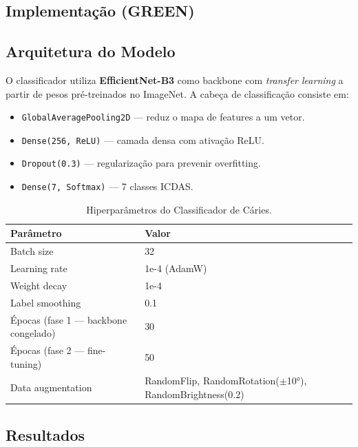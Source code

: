 \subsection{Implementação (GREEN)}


\subsection{Arquitetura do Modelo}

O classificador utiliza \textbf{EfficientNet-B3} como backbone com
\textit{transfer learning} a partir de pesos pré-treinados no ImageNet.
A cabeça de classificação consiste em:

\begin{itemize}
  \item \texttt{GlobalAveragePooling2D} — reduz o mapa de features a um vetor.
  \item \texttt{Dense(256, ReLU)} — camada densa com ativação ReLU.
  \item \texttt{Dropout(0.3)} — regularização para prevenir overfitting.
  \item \texttt{Dense(7, Softmax)} — 7 classes ICDAS.
\end{itemize}

\begin{table}[H]
  \centering
  \caption{Hiperparâmetros do Classificador de Cáries.}
  \label{tab:caries-hyperparams}
  \begin{tabularx}{\textwidth}{lX}
    \toprule
    \textbf{Parâmetro} & \textbf{Valor} \\
    \midrule
    Batch size & 32 \\
    Learning rate & 1e-4 (AdamW) \\
    Weight decay & 1e-4 \\
    Label smoothing & 0.1 \\
    Épocas (fase 1 — backbone congelado) & 30 \\
    Épocas (fase 2 — fine-tuning) & 50 \\
    Data augmentation & RandomFlip, RandomRotation($\pm$10°), RandomBrightness(0.2) \\
    \bottomrule
  \end{tabularx}
\end{table}

\subsection{Resultados}

